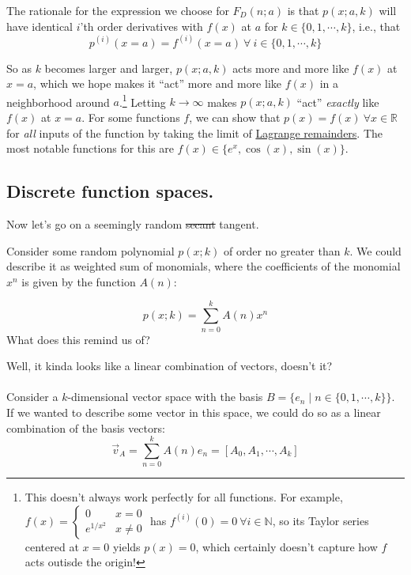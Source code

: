\documentclass[letterpaper,12pt]{report}
\begin{document}
The rationale for the expression we choose for \(F_D(n;a)\) 
is that \(p(x;a,k)\) will have identical \(i\)'th order derivatives with \(f(x)\) at \(a\)
for \(k \in \{0, 1, \cdots, k\}\), i.e., that
\[p^{(i)}(x=a) = f^{(i)}(x=a) \ \forall \ i \in \{0, 1, \cdots, k \}    \]

So as \(k\) becomes larger and larger, \(p(x;a,k)\) acts more and more like \(f(x)\)
at \(x=a\),
which we hope makes it ``act'' more and more like \(f(x)\)
in a neighborhood around \(a\).\footnote
{
  This doesn't always work perfectly for all functions. For example,
  \(f(x) = 
  \begin{cases}
    0 & x = 0 \\
    e^{1/x^2} & x \neq 0
  \end{cases}
  \)
  has \(f^{(i)}(0) = 0 \ \forall i \in \mathbb{N}\), 
  so its Taylor series centered at \(x=0\) yields \(p(x) = 0\),
  which certainly doesn't capture how \(f\) acts outisde the origin!
}
Letting \(k \rightarrow \infty\) makes \(p(x;a,k)\) ``act'' \emph{exactly}
like \(f(x)\) at \(x=a\).
For some functions \(f\), 
we can show that \(p(x) = f(x) \ \forall x\in \mathbb{R}\) for \emph{all} 
inputs of the function
by taking the limit of \href{https://math.stackexchange.com/a/2136695}{Lagrange remainders}.
The most notable functions for this are \(f(x) \in \{e^x,\cos(x),\sin(x)\}\).\par


\subsection{Discrete function spaces.}

Now let's go on a seemingly random \sout{secant} tangent.\par
Consider some random polynomial \(p(x;k)\) of order no greater than \(k\).
We could describe it as weighted sum of monomials, where the coefficients
of the monomial \(x^n\) is given by the function \(A(n)\):

\[p(x;k) = \sum_{n=0}^{k}A(n) x^n\]
What does this remind us of?\par
Well, it kinda looks like a linear combination of vectors, doesn't it?
\\
\\
Consider a \(k\)-dimensional vector space with the basis
\(B = \{e_n \mid n \in \{0, 1, \cdots, k\}\}\).
If we wanted to describe some vector in this space, we could do so as a linear
combination of the basis vectors:
\[ \vec{v}_A = \sum_{n=0}^{k}A(n) e_n = [A_0, A_1, \cdots, A_k]\]
\end{document}
